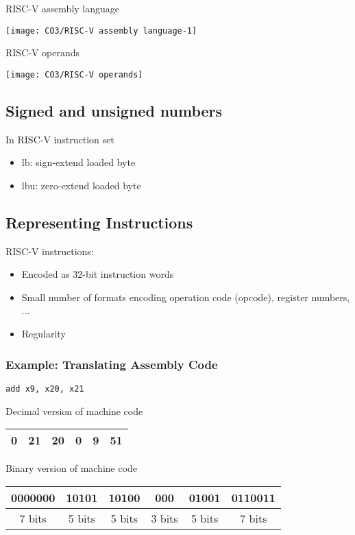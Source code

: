 \begin{table}[!htb]
    \centering
    \caption{RISC-V assembly language}
    \texttt{[image: CO3/RISC-V assembly language-1]}
\end{table}

\begin{table}[!htb]
    \centering
    \caption{RISC-V operands}
    \texttt{[image: CO3/RISC-V operands]}
\end{table}

\subsection{Signed and unsigned numbers}
In RISC-V instruction set
\begin{itemize}
    \item lb: sign-extend loaded byte
    \item lbu: zero-extend loaded byte
\end{itemize}

\subsection{Representing Instructions}
RISC-V instructions: 
\begin{itemize}
    \item Encoded as 32-bit instruction words
    \item Small number of formats encoding operation code (opcode), register numbers, ...
    \item Regularity
\end{itemize}

\subsubsection{Example: Translating Assembly Code}
\begin{lstlisting}[language={[x86masm]Assembler},title={Compiled RISC-V code}]
add x9, x20, x21
\end{lstlisting}

Decimal version of machine code
\begin{table}[!htb]
    \centering
    \begin{tabular}[c]{|c|c|c|c|c|c|}\hline
        0 & 21 & 20 & 0 & 9 &51 \\ \hline
    \end{tabular}
\end{table}

Binary version of machine code
\begin{table}[!htb]
    \centering
    \begin{tabular}[c]{|c|c|c|c|c|c|}\hline
        0000000 & 10101 & 10100 & 000 & 01001 & 0110011 \\ \hline
        7 bits & 5 bits & 5 bits & 3 bits & 5 bits &7 bits \\ \hline
    \end{tabular}
\end{table}


